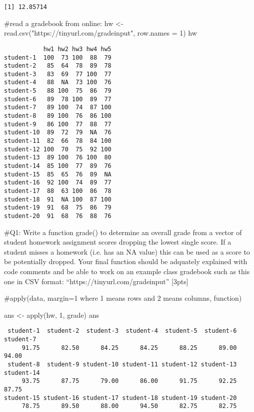\documentclass[
  letterpaper,
  DIV=11,
  numbers=noendperiod]{scrartcl}
\newenvironment{Shaded}{\begin{snugshade}}{\end{snugshade}}
\newcommand{\AttributeTok}[1]{\textcolor[rgb]{0.40,0.45,0.13}{#1}}
\newcommand{\CommentTok}[1]{\textcolor[rgb]{0.37,0.37,0.37}{#1}}
\newcommand{\DecValTok}[1]{\textcolor[rgb]{0.68,0.00,0.00}{#1}}
\newcommand{\FunctionTok}[1]{\textcolor[rgb]{0.28,0.35,0.67}{#1}}
\newcommand{\NormalTok}[1]{\textcolor[rgb]{0.00,0.23,0.31}{#1}}
\newcommand{\OtherTok}[1]{\textcolor[rgb]{0.00,0.23,0.31}{#1}}
\newcommand{\StringTok}[1]{\textcolor[rgb]{0.13,0.47,0.30}{#1}}
\begin{document}
\begin{verbatim}
[1] 12.85714
\end{verbatim}

\begin{Shaded}
\begin{Highlighting}[]
\CommentTok{\#read a gradebook from online:}
\NormalTok{hw }\OtherTok{\textless{}{-}} \FunctionTok{read.csv}\NormalTok{(}\StringTok{"https://tinyurl.com/gradeinput"}\NormalTok{, }\AttributeTok{row.names =} \DecValTok{1}\NormalTok{)}
\NormalTok{hw}
\end{Highlighting}
\end{Shaded}

\begin{verbatim}
           hw1 hw2 hw3 hw4 hw5
student-1  100  73 100  88  79
student-2   85  64  78  89  78
student-3   83  69  77 100  77
student-4   88  NA  73 100  76
student-5   88 100  75  86  79
student-6   89  78 100  89  77
student-7   89 100  74  87 100
student-8   89 100  76  86 100
student-9   86 100  77  88  77
student-10  89  72  79  NA  76
student-11  82  66  78  84 100
student-12 100  70  75  92 100
student-13  89 100  76 100  80
student-14  85 100  77  89  76
student-15  85  65  76  89  NA
student-16  92 100  74  89  77
student-17  88  63 100  86  78
student-18  91  NA 100  87 100
student-19  91  68  75  86  79
student-20  91  68  76  88  76
\end{verbatim}

\begin{Shaded}
\begin{Highlighting}[]
\CommentTok{\#Q1: Write a function grade() to determine an overall grade from a vector of student homework assignment scores dropping the lowest single score. If a student misses a homework (i.e. has an NA value) this can be used as a score to be potentially dropped. Your final function should be adquately explained with code comments and be able to work on an example class gradebook such as this one in CSV format: “https://tinyurl.com/gradeinput” [3pts]}

\CommentTok{\#apply(data, margin=1 where 1 means rows and 2 means columns, function)}

\NormalTok{ans }\OtherTok{\textless{}{-}} \FunctionTok{apply}\NormalTok{(hw, }\DecValTok{1}\NormalTok{, grade)}
\NormalTok{ans}
\end{Highlighting}
\end{Shaded}

\begin{verbatim}
 student-1  student-2  student-3  student-4  student-5  student-6  student-7 
     91.75      82.50      84.25      84.25      88.25      89.00      94.00 
 student-8  student-9 student-10 student-11 student-12 student-13 student-14 
     93.75      87.75      79.00      86.00      91.75      92.25      87.75 
student-15 student-16 student-17 student-18 student-19 student-20 
     78.75      89.50      88.00      94.50      82.75      82.75 
\end{verbatim}
\end{document}

